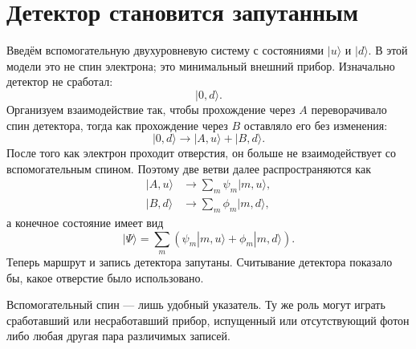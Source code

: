 \section{Детектор становится запутанным}

Введём вспомогательную двухуровневую систему с состояниями \(|u\rangle\) и \(|d\rangle\). В этой модели это не спин электрона; это минимальный внешний прибор. Изначально детектор не сработал:
\begin{equation}
|0,d\rangle.
\end{equation}
Организуем взаимодействие так, чтобы прохождение через \(A\) переворачивало спин детектора, тогда как прохождение через \(B\) оставляло его без изменения:
\begin{equation}
|0,d\rangle
\longrightarrow
|A,u\rangle+|B,d\rangle.
\end{equation}
После того как электрон проходит отверстия, он больше не взаимодействует со вспомогательным спином. Поэтому две ветви далее распространяются как
\begin{align}
|A,u\rangle &\longrightarrow \sum_m\psi_m|m,u\rangle, \\
|B,d\rangle &\longrightarrow \sum_m\phi_m|m,d\rangle,
\end{align}
а конечное состояние имеет вид
\begin{equation}
|\Psi\rangle
=\sum_m\left(\psi_m|m,u\rangle+\phi_m|m,d\rangle\right).
\end{equation}
Теперь маршрут и запись детектора запутаны. Считывание детектора показало бы, какое отверстие было использовано.

\begin{classroomqa}
\end{classroomqa}

Вспомогательный спин — лишь удобный указатель. Ту же роль могут играть сработавший или несработавший прибор, испущенный или отсутствующий фотон либо любая другая пара различимых записей.

\begin{classroomqa}
\end{classroomqa}

